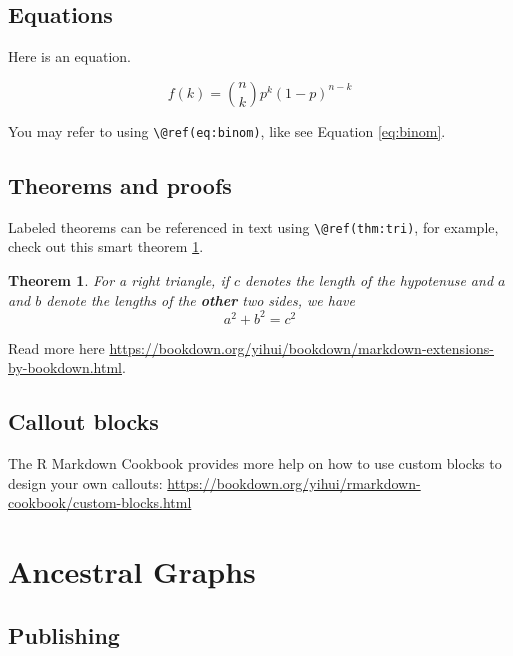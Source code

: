 \documentclass[
]{book}
\newtheorem{theorem}{Theorem}[chapter]
\theoremstyle{definition}
\theoremstyle{definition}
\theoremstyle{definition}
\theoremstyle{definition}
\theoremstyle{remark}
\begin{document}
\hypertarget{equations}{%
\section{Equations}\label{equations}}

Here is an equation.

\begin{equation} 
  f\left(k\right) = \binom{n}{k} p^k\left(1-p\right)^{n-k}
  \label{eq:binom}
\end{equation}

You may refer to using \texttt{\textbackslash{}@ref(eq:binom)}, like see Equation \eqref{eq:binom}.

\hypertarget{theorems-and-proofs}{%
\section{Theorems and proofs}\label{theorems-and-proofs}}

Labeled theorems can be referenced in text using \texttt{\textbackslash{}@ref(thm:tri)}, for example, check out this smart theorem \ref{thm:tri}.

\begin{theorem}
\protect\hypertarget{thm:tri}{}\label{thm:tri}For a right triangle, if \(c\) denotes the \emph{length} of the hypotenuse
and \(a\) and \(b\) denote the lengths of the \textbf{other} two sides, we have
\[a^2 + b^2 = c^2\]
\end{theorem}

Read more here \url{https://bookdown.org/yihui/bookdown/markdown-extensions-by-bookdown.html}.

\hypertarget{callout-blocks}{%
\section{Callout blocks}\label{callout-blocks}}

The R Markdown Cookbook provides more help on how to use custom blocks to design your own callouts: \url{https://bookdown.org/yihui/rmarkdown-cookbook/custom-blocks.html}

\hypertarget{ancestral-graphs}{%
\chapter{Ancestral Graphs}\label{ancestral-graphs}}

\hypertarget{publishing}{%
\section{Publishing}\label{publishing}}
\end{document}
